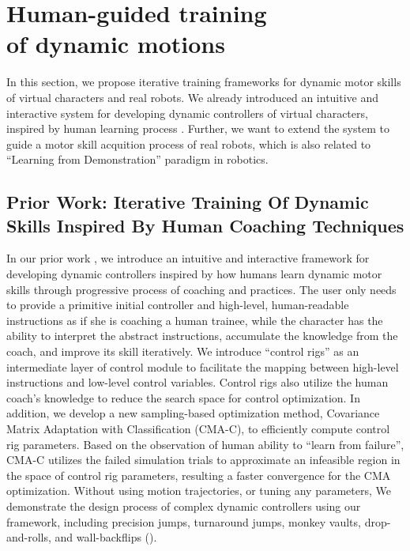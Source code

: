 \chapter{Human-guided training \protect\\ of dynamic motions}
In this section, we propose iterative training frameworks for
dynamic motor skills of virtual characters and real robots.
We already introduced an intuitive and interactive system for
developing dynamic controllers of virtual characters,
inspired by human learning process \cite{fitts:1967:hp}.
Further, we want to extend the system to guide a motor skill 
acquition process of real robots, which is also related to
``Learning from Demonstration'' paradigm in robotics.

\section{Prior Work: Iterative Training Of Dynamic Skills Inspired By Human Coaching Techniques}

In our prior work \cite{Ha:2014:ITD},
we introduce an intuitive and interactive framework for developing 
dynamic controllers inspired by how humans learn dynamic motor
skills through progressive process of coaching and practices. 
The user only needs to provide a primitive initial controller and
high-level, human-readable instructions as if
she is coaching a human trainee, while the character has the ability
to interpret the abstract instructions, accumulate the knowledge from
the coach, and improve its skill iteratively. We introduce ``control
rigs'' as an intermediate layer of control module to facilitate the
mapping between high-level instructions and low-level control
variables. Control rigs also utilize the human coach's knowledge to
reduce the search space for control optimization. In addition, we
develop a new sampling-based optimization method, Covariance Matrix
Adaptation with Classification (CMA-C), to efficiently compute control
rig parameters. Based on the observation of human ability to ``learn
from failure'', CMA-C utilizes the failed simulation trials to
approximate an infeasible region in the space of control rig
parameters, resulting a faster convergence for the CMA
optimization. 
Without using motion trajectories, or tuning any parameters,
We demonstrate the design process of complex dynamic
controllers using our framework, including precision jumps, turnaround
jumps, monkey vaults, drop-and-rolls, and wall-backflips 
().



